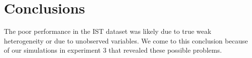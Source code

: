 

\chapter{Conclusions}




The poor performance in the IST dataset was likely due to true weak heterogeneity or due to unobserved variables. We come to this conclusion because of our simulations in experiment 3 that revealed these possible problems.


